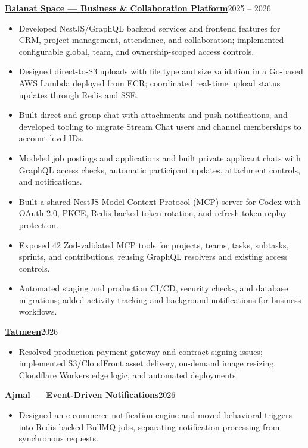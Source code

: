 \documentclass[a4paper,10pt]{article}
\newcommand{\project}[3]{\textbf{\href{#2}{#1}}\hfill #3\par}
\begin{document}
\project{Baianat Space --- Business \& Collaboration Platform}{https://space.baianat.com}{2025 -- 2026}
\begin{itemize}
\item Developed NestJS/GraphQL backend services and frontend features for CRM, project management, attendance, and collaboration; implemented configurable global, team, and ownership-scoped access controls.
\item Designed direct-to-S3 uploads with file type and size validation in a Go-based AWS Lambda deployed from ECR; coordinated real-time upload status updates through Redis and SSE.
\item Built direct and group chat with attachments and push notifications, and developed tooling to migrate Stream Chat users and channel memberships to account-level IDs.
\item Modeled job postings and applications and built private applicant chats with GraphQL access checks, automatic participant updates, attachment controls, and notifications.
\item Built a shared NestJS Model Context Protocol (MCP) server for Codex with OAuth 2.0, PKCE, Redis-backed token rotation, and refresh-token replay protection.
\item Exposed 42 Zod-validated MCP tools for projects, teams, tasks, subtasks, sprints, and contributions, reusing GraphQL resolvers and existing access controls.
\item Automated staging and production CI/CD, security checks, and database migrations; added activity tracking and background notifications for business workflows.
\end{itemize}

\project{Tatmeen}{https://tatmeen.sa}{2026}
\begin{itemize}
\item Resolved production payment gateway and contract-signing issues; implemented S3/CloudFront asset delivery, on-demand image resizing, Cloudflare Workers edge logic, and automated deployments.
\end{itemize}

\project{Ajmal --- Event-Driven Notifications}{https://ajmal.app}{2026}
\begin{itemize}
\item Designed an e-commerce notification engine and moved behavioral triggers into Redis-backed BullMQ jobs, separating notification processing from synchronous requests.
\end{itemize}
\end{document}
